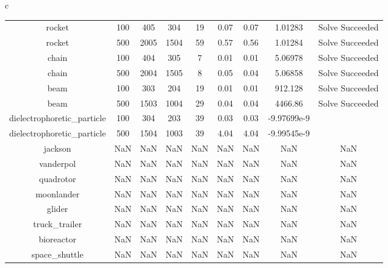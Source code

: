 \documentclass{standalone}
\begin{document}
\begin{tabular}{c}
\begin{tabular}{ccccccccc}
  rocket & 100 & 405 & 304 & 19 & 0.07 & 0.07 & 1.01283 & Solve Succeeded \\
  rocket & 500 & 2005 & 1504 & 59 & 0.57 & 0.56 & 1.01284 & Solve Succeeded \\
  chain & 100 & 404 & 305 & 7 & 0.01 & 0.01 & 5.06978 & Solve Succeeded \\
  chain & 500 & 2004 & 1505 & 8 & 0.05 & 0.04 & 5.06858 & Solve Succeeded \\
  beam & 100 & 303 & 204 & 19 & 0.01 & 0.01 & 912.128 & Solve Succeeded \\
  beam & 500 & 1503 & 1004 & 29 & 0.04 & 0.04 & 4466.86 & Solve Succeeded \\
  dielectrophoretic\_particle & 100 & 304 & 203 & 39 & 0.03 & 0.03 & -9.97699e-9 & \color{red}{Infeasible Problem} \\
  dielectrophoretic\_particle & 500 & 1504 & 1003 & 39 & 4.04 & 4.04 & -9.99545e-9 & \color{red}{Infeasible Problem} \\
  jackson & NaN & NaN & NaN & NaN & NaN & NaN & NaN & NaN \\
  vanderpol & NaN & NaN & NaN & NaN & NaN & NaN & NaN & NaN \\
  quadrotor & NaN & NaN & NaN & NaN & NaN & NaN & NaN & NaN \\
  moonlander & NaN & NaN & NaN & NaN & NaN & NaN & NaN & NaN \\
  glider & NaN & NaN & NaN & NaN & NaN & NaN & NaN & NaN \\
  truck\_trailer & NaN & NaN & NaN & NaN & NaN & NaN & NaN & NaN \\
  bioreactor & NaN & NaN & NaN & NaN & NaN & NaN & NaN & NaN \\
  space\_shuttle & NaN & NaN & NaN & NaN & NaN & NaN & NaN & NaN \\\hline
\end{tabular}
\end{tabular}
\end{document}
